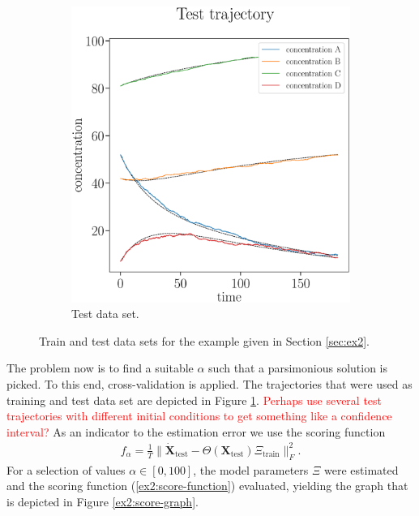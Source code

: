 \documentclass[oneside, abstracton, titlepage]{scrartcl}
\begin{document}
\begin{figure}
\begin{subfigure}[b]{.45\textwidth}
			\includegraphics[width=\textwidth]{./figures_tex/cv_concentrations_test}
			\caption{Test data set.}
		\end{subfigure}
		\caption{Train and test data sets for the example given in Section \ref{sec:ex2}.}
		\label{ex2:test-train-concentration-curves}
	\end{figure}
	
	The problem now is to find a suitable $\alpha$ such that a parsimonious solution is picked. To this end, cross-validation is applied. The trajectories that were used as training and test data set are depicted in Figure \ref{ex2:test-train-concentration-curves}. \textcolor{red}{Perhaps use several test trajectories with different initial conditions to get something like a confidence interval?} As an indicator to the estimation error we use the scoring function
	\begin{align}
		f_\alpha = \frac{1}{T}\|\mathbf{\dot{X}}_\text{test} - \Theta (\textbf{X}_\text{test}) \Xi_\text{train}\|_F^2.
		\label{ex2:score-function}
	\end{align}
	For a selection of values $\alpha\in [0, 100]$, the model parameters $\Xi$ were estimated and the scoring function (\ref{ex2:score-function}) evaluated, yielding the graph that is depicted in Figure \ref{ex2:score-graph}.
	
\end{document}
